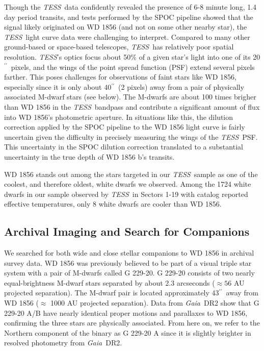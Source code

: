 \documentclass{nature3}
\newcommand{\arcsecond}{\ensuremath{^{\prime\prime}}}
\newcommand{\project}[1]{\textsl{#1}}
\newcommand{\Gaia}{\project{Gaia}}
\newcommand{\TESS}{\project{TESS}}
\begin{document}
\begin{methods}
Though the \TESS\ data confidently revealed the presence of 6-8 minute long, 1.4 day period transits, and tests performed by the SPOC pipeline showed that the signal likely originated on WD 1856 (and not on some other nearby star), the \TESS\ light curve data were challenging to interpret. Compared to many other ground-based or space-based telescopes, \TESS\ has relatively poor spatial resolution. \TESS's optics focus about 50\% of a given star's light into one of its 20\arcsecond\ pixels, and the wings of the point spread function (PSF) extend several pixels farther. This poses challenges for observations of faint stars like WD 1856, especially since it is only about 40\arcsecond\ (2 pixels) away from a pair of physically associated M-dwarf stars (see below). The M-dwarfs are about 100 times brigher than WD 1856 in the \TESS\ bandpass and contribute a significant amount of flux into WD 1856's photometric aperture. In situations like this, the dilution correction applied by the SPOC pipeline to the WD 1856 light curve is fairly uncertain given the difficulty in precisely measuring the wings of the \TESS\ PSF. This uncertainty in the SPOC dilution correction translated to a substantial uncertainty in the true depth of WD 1856 b's transits. 

WD 1856 stands out among the stars targeted in our \TESS\ sample as one of the coolest, and therefore oldest, white dwarfs we observed. Among the 1724 white dwarfs in our sample observed by \TESS\ in Sectors 1-19 with catalog reported effective temperatures\cite{GentileFusillo}, only 8 white dwarfs are cooler than WD 1856. 



\subsection{Archival Imaging and Search for Companions}
We searched for both wide and close stellar companions to WD 1856 in archival survey data. WD 1856 was previously believed\cite{mccooksion} to be part of a visual triple star system with a pair of M-dwarfs called  G 229-20. G 229-20 consists of two nearly equal-brightness M-dwarf stars separated by about 2.3 arcseconds ($\approx 56$ AU projected separation). The M-dwarf pair is located approximately 43\arcsecond\ away from WD 1856 ($\approx$ 1000 AU projected separation). Data from \Gaia\ DR2 show that G 229-20 A/B have nearly identical proper motions and parallaxes to WD 1856, confirming the three stars are physically associated. From here on, we refer to the Northern component of the binary as G 229-20 A since it is slightly brighter in resolved photometry from \Gaia\ DR2.


\end{methods}
\end{document}
